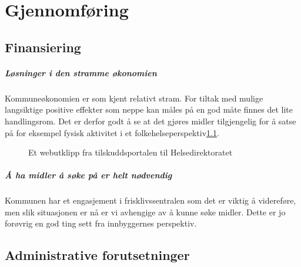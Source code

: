 \documentclass[12pt]{memoir} %
\begin{document}
\chapter{Gjennomføring}
	\section{Finansiering}
		\paragraph{Løsninger i den stramme økonomien\\}
			Kommuneøkonomien er som kjent relativt stram. For tiltak med mulige langsiktige positive effekter som neppe kan måles på en god måte finnes det lite handlingsrom. Det er derfor godt å se at det gjøres midler tilgjengelig for å satse på for eksempel fysisk aktivitet i et folkehelseperspektiv\ref{faktfhfig}.
					\begin{figure}[h]
                      \centering
                    	  \captionsetup{singlelinecheck=off}
                      	\caption{Et webutklipp fra tilskuddsportalen til Helsedirektoratet}
                      	\label{faktfhfig}
                    \end{figure}   
        \paragraph{Å ha midler å søke på er helt nødvendig\\}
            Kommunen har et engasjement i frisklivssentralen som det er viktig å videreføre, men slik situasjonen er nå er vi avhengige av å kunne søke midler. Dette er jo forøvrig en god ting sett fra innbyggernes perspektiv.
	\section{Administrative forutsetninger}
\end{document}

